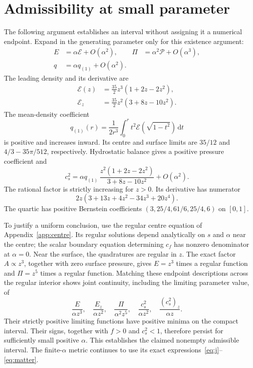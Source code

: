 \documentclass[journal,a4paper]{IEEEtran}
\newcommand{\dd}{\mathrm d}
\begin{document}
\section{Admissibility at small parameter}
\label{app:admissibility}
The following argument establishes an interval without assigning it a numerical endpoint. Expand in the generating parameter only for this existence argument:
\begin{align}
 E&=\alpha\mathcal E+O(\alpha^2),&
 \Pi&=\alpha^2\mathcal P+O(\alpha^3),\nonumber\\
 q&=\alpha q_{(1)}+O(\alpha^2).
\end{align}
The leading density and its derivative are
\begin{align}
 \mathcal E(z)&=\tfrac{35}{2}z^3(1+2z-2z^2),\nonumber\\
 \mathcal E_z&=\tfrac{35}{2}z^2(3+8z-10z^2).
\end{align}
The mean-density coefficient
\begin{equation}
 q_{(1)}(r)=\frac1{2r^3}\int_0^r t^2\mathcal E(\sqrt{1-t^2})\,\dd t
\end{equation}
is positive and increases inward. Its centre and surface limits are $35/12$ and $4/3-35\pi/512$, respectively. Hydrostatic balance gives a positive pressure coefficient and
\begin{equation}
 c_s^2=\alpha q_{(1)}\,
 \frac{z^2(1+2z-2z^2)}{3+8z-10z^2}+O(\alpha^2).
\end{equation}
The rational factor is strictly increasing for $z>0$. Its derivative has numerator
\begin{equation}
 2z(3+13z+4z^2-34z^3+20z^4).
\end{equation}
The quartic has positive Bernstein coefficients
$(3,25/4,61/6,25/4,6)$ on $[0,1]$.

To justify a uniform conclusion, use the regular centre equation of Appendix~\ref{app:centre}. Its regular solutions depend analytically on $s$ and $\alpha$ near the centre; the scalar boundary equation determining $c_f$ has nonzero denominator at $\alpha=0$. Near the surface, the quadratures are regular in $z$. The exact factor $A\propto z^3$, together with zero surface pressure, gives $E=z^3$ times a regular function and $\Pi=z^5$ times a regular function. Matching these endpoint descriptions across the regular interior shows joint continuity, including the limiting parameter value, of
\begin{equation}
 \frac{E}{\alpha z^3},\quad
 \frac{E_z}{\alpha z^2},\quad
 \frac{\Pi}{\alpha^2z^5},\quad
 \frac{c_s^2}{\alpha z^2},\quad
 \frac{(c_s^2)_z}{\alpha z}.
\end{equation}
Their strictly positive limiting functions have positive minima on the compact interval. Their signs, together with $f>0$ and $c_s^2<1$, therefore persist for sufficiently small positive $\alpha$. This establishes the claimed nonempty admissible interval. The finite-$\alpha$ metric continues to use its exact expressions~\eqref{eq:j}--\eqref{eq:matter}.
\end{document}

